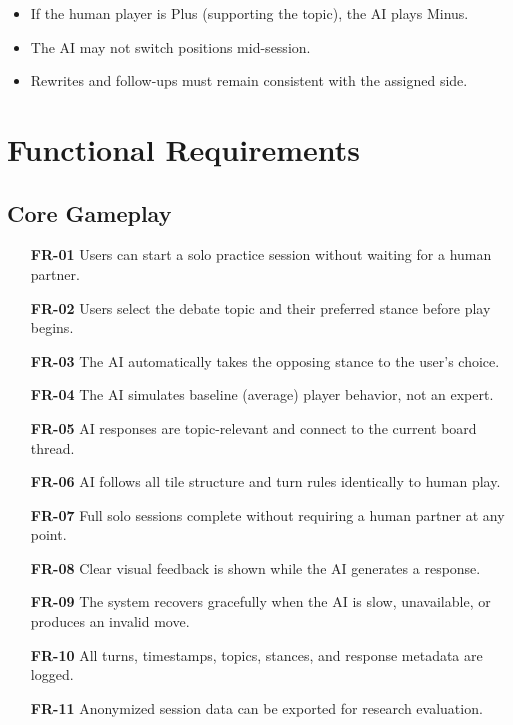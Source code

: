 \documentclass[11pt]{article}
\begin{document}
\begin{itemize}
  \item If the human player is Plus (supporting the topic), the AI plays Minus.
  \item The AI may not switch positions mid-session.
  \item Rewrites and follow-ups must remain consistent with the assigned side.
\end{itemize}

\section{Functional Requirements}

\subsection{Core Gameplay}

\begin{enumerate}
  \item[\textbf{FR-01}] Users can start a solo practice session without waiting for a human partner.
  \item[\textbf{FR-02}] Users select the debate topic and their preferred stance before play begins.
  \item[\textbf{FR-03}] The AI automatically takes the opposing stance to the user's choice.
  \item[\textbf{FR-04}] The AI simulates baseline (average) player behavior, not an expert.
  \item[\textbf{FR-05}] AI responses are topic-relevant and connect to the current board thread.
  \item[\textbf{FR-06}] AI follows all tile structure and turn rules identically to human play.
  \item[\textbf{FR-07}] Full solo sessions complete without requiring a human partner at any point.
  \item[\textbf{FR-08}] Clear visual feedback is shown while the AI generates a response.
  \item[\textbf{FR-09}] The system recovers gracefully when the AI is slow, unavailable, or produces
        an invalid move.
  \item[\textbf{FR-10}] All turns, timestamps, topics, stances, and response metadata are logged.
  \item[\textbf{FR-11}] Anonymized session data can be exported for research evaluation.
\end{enumerate}
\end{document}
